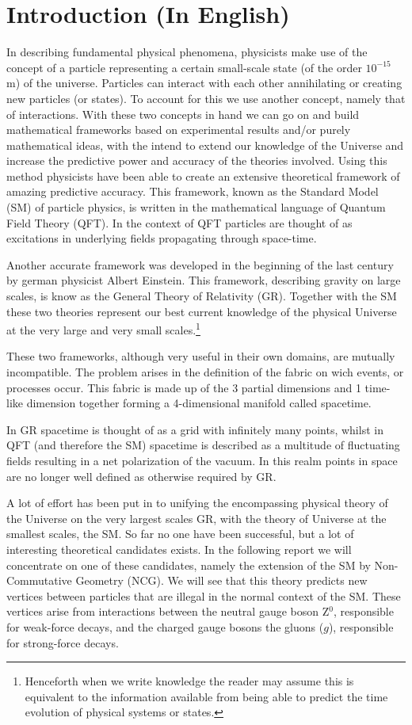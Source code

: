 \section{Introduction (In English)}
In describing fundamental physical phenomena, physicists make use of the concept of a particle representing a certain small-scale state (of the order $10^{-15}$ m) of the universe. Particles can interact with each other annihilating or creating new particles (or states). To account for this we use another concept, namely that of interactions. With these two concepts in hand we can go on and build mathematical frameworks based on experimental results and/or purely mathematical ideas, with the intend to extend our knowledge of the Universe and increase the predictive power and accuracy of the theories involved. Using this method physicists have been able to create an extensive theoretical framework of amazing predictive accuracy. This framework, known as the Standard Model (SM) of particle physics, is written in the mathematical language of Quantum Field Theory (QFT). In the context of QFT particles are thought of as excitations in underlying fields propagating through space-time.

Another accurate framework was developed in the beginning of the last century by german physicist Albert Einstein. This framework, describing gravity on large scales, is know as the General Theory of Relativity (GR). Together with the SM these two theories represent our best current knowledge of the physical Universe at the very large and very small scales.\footnote{Henceforth when we write knowledge the reader may assume this is equivalent to the information available from being able to predict the time evolution of physical systems or states.}

These two frameworks, although very useful in their own domains, are mutually incompatible. The problem arises in the definition of the fabric on wich events, or processes occur. This fabric is made up of the 3 partial dimensions and 1 time-like dimension together forming a 4-dimensional manifold called spacetime.

In GR spacetime is thought of as a grid with infinitely many points, whilst in QFT (and therefore the SM) spacetime is described as a multitude of fluctuating fields resulting in a net polarization of the vacuum. In this realm points in space are no longer well defined as otherwise required by GR.

A lot of effort has been put in to unifying the encompassing physical theory of the Universe on the very largest scales GR, with the theory of Universe at the smallest scales, the SM. So far no one have been successful, but a lot of interesting theoretical candidates exists. In the following report we will concentrate on one of these candidates, namely the extension of the SM by Non-Commutative Geometry (NCG). We will see that this theory predicts new vertices between particles that are illegal in the normal context of the SM. These vertices arise from interactions between the neutral gauge boson Z$^0$, responsible for weak-force decays, and the charged gauge bosons the gluons ($g$), responsible for strong-force decays.

